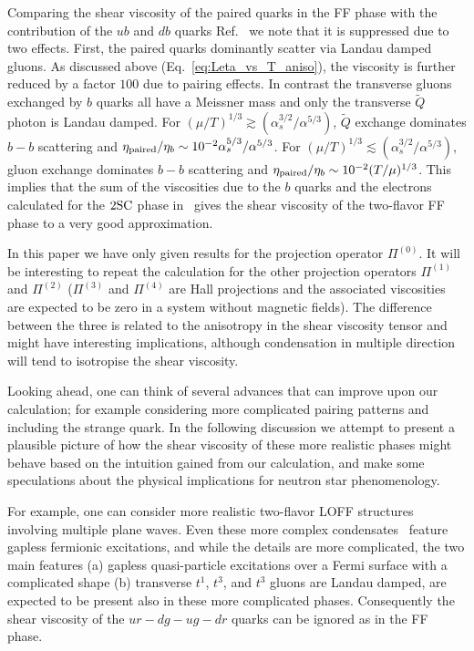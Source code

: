 \documentclass[10pt, aps, prd, superscriptaddress, nofootinbib, 
               amsmath, amssymb, twocolumn,
               preprintnumbers, showpacs,
               raggedbottom,
               floatfix]{revtex4-1}
\newcommand{\SC}{{\rm{SC}}}
\begin{document}
 Comparing the shear viscosity of the paired quarks in the FF phase with the
contribution of the $ub$ and $db$ quarks Ref.~\cite{Alford:2014doa} we
note that it is suppressed due to two effects.  First, the paired quarks
dominantly scatter via Landau damped gluons. As discussed above
(Eq.~\ref{eq:Leta_vs_T_aniso}), the viscosity is further reduced by a factor
$100$ due to pairing effects. In contrast the transverse gluons exchanged by
$b$ quarks all have a Meissner mass and only the transverse $\tilde{Q}$ photon is
Landau damped. For 
$(\mu/T)^{1/3}\gtrsim (\alpha_s^{3/2}/\alpha^{5/3})$, $\tilde{Q}$ exchange 
dominates $b-b$ scattering and $\eta_{\rm{paired}}/\eta_b\sim
10^{-2}\alpha_s^{5/3}/\alpha^{5/3}$. For 
$(\mu/T)^{1/3}\lesssim (\alpha_s^{3/2}/\alpha^{5/3})$, gluon exchange 
dominates $b-b$ scattering and $\eta_{\rm{paired}}/\eta_b\sim
10^{-2}(T/\mu)^{1/3}$. This implies that the sum of the viscosities
due to the $b$ quarks and the electrons calculated for the $2\SC$ phase
in~\cite{Alford:2014doa} gives the shear viscosity of the two-flavor FF
phase to a very good approximation.

In this paper we have only given results for the projection operator
$\Pi^{(0)}$. It will be interesting to repeat the calculation for the other
projection operators $\Pi^{(1)}$ and $\Pi^{(2)}$ ($\Pi^{(3)}$ and $\Pi^{(4)}$
are Hall projections and the associated viscosities are expected to be zero in a system without magnetic
fields). The difference between the three is related to the anisotropy in the
shear viscosity tensor and might have interesting implications, although
condensation in multiple direction will tend to isotropise the shear viscosity.

Looking ahead, one can think of several advances that can improve upon our
calculation; for example considering more complicated pairing patterns and
including the strange quark. In the following discussion we attempt to present
a plausible picture of how the shear viscosity of these more realistic phases
might behave based on the intuition gained from our calculation, and make some 
speculations about the physical implications for neutron star phenomenology.

For example, one can consider more realistic two-flavor LOFF
structures~\cite{Bowers:2002xr} involving multiple plane waves. Even these more
complex condensates~\cite{Casalbuoni:2001gt} feature gapless fermionic
excitations, and while the details are more complicated, the two main features
(a) gapless quasi-particle excitations over a Fermi surface with a complicated
shape (b) transverse $t^1$, $t^3$, and $t^3$ gluons are Landau damped, are
expected to be present also in these more complicated phases. Consequently the
shear viscosity of the $ur-dg-ug-dr$ quarks can be ignored as in the FF phase.  
\end{document}
